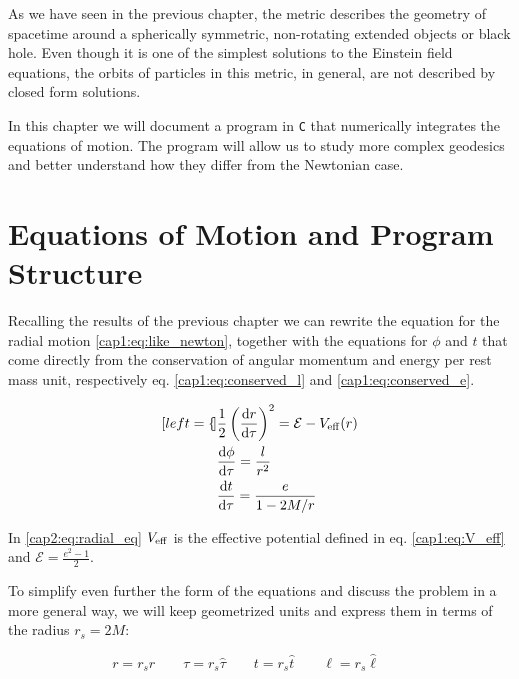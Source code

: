 
As we have seen in the previous chapter, the \Sh metric describes the
geometry of spacetime around a spherically symmetric, non-rotating extended
objects or black hole.
Even though it is one of the simplest solutions to the Einstein field equations,
the orbits of particles in this metric, in general, are not described by closed
form solutions.

In this chapter we will document a program in \texttt{C} that numerically
integrates the equations of motion.
The program will allow us to study more complex geodesics and better understand
how they differ from the Newtonian case.


\section{Equations of Motion and Program Structure}
\label{cap2:sec:eq_of_motion}

Recalling the results of the previous chapter we can rewrite the equation for
the radial motion \ref{cap1:eq:like_newton}, together with the equations for
$\phi$ and $t$ that come directly from the conservation of angular momentum and
energy per rest mass unit, respectively eq. \ref{cap1:eq:conserved_l} and
\ref{cap1:eq:conserved_e}.

\begin{subequations}
\label{cap2:eq:eq_of_motion}
	\begin{align}[left = {\empheqlbrace}]
        &\frac{1}{2} \left(\dv{r}{\tau}\right)^2 = \mathcal E - V_{\rm eff} (r)
        \label{cap2:eq:radial_eq} \\
        &\dv{\phi}{\tau} = \frac{l}{r^2} \\
        &\dv{t}{\tau} = \frac{e}{1 - 2 M / r}
	\end{align}
\end{subequations}

In \ref{cap2:eq:radial_eq} $V_{\rm eff}$ is the effective potential defined in eq.
\ref{cap1:eq:V_eff} and $\mathcal E = \frac{e^2 - 1}{2}$.

To simplify even further the form of the equations and discuss the problem in a
more general way, we will keep geometrized units and express them in terms of
the \Sh radius $r_s = 2 M$:

\begin{equation}
    r = r_s \hat r \quad \quad
    \tau = r_s \hat \tau \quad \quad
    t = r_s \hat t \quad \quad
    \ell = r_s \hat \ell \quad \quad
\end{equation}

